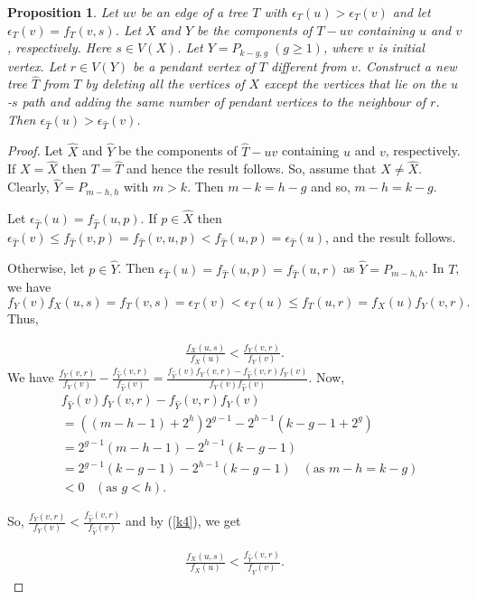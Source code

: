 \documentclass[10pt,a4paper]{amsart}
\newtheorem{proposition}[theorem]{Proposition}
\begin{document}
\begin{proposition} \label{prop5}
Let $uv$ be an edge of a tree $T$ with $\epsilon_{T}(u)>\epsilon_{T}(v)$ and let $\epsilon_{T}(v)=f_T(v,s)$. Let $X$ and $Y$ be the components of $T-uv$ containing $u$ and $v$, respectively. Here $s\in V(X)$.  Let $Y=P_{k-g,g}\;(g\geq 1)$, where $v$ is initial vertex. Let $r\in V(Y)$ be a pendant vertex of $T$ different from $v$. Construct a new tree $\hat{T}$ from $T$ by deleting all the vertices of $X$ except the vertices that lie on the $u$-$s$ path and adding the same number of pendant vertices to the neighbour of $r$. Then $\epsilon_{\hat{T}}(u)>\epsilon_{\hat{T}}(v)$.   
\end{proposition}
\begin{proof}
Let  $\hat{X}$ and $\hat{Y}$ be the components of $\hat{T}-uv$ containing $u$ and $v$, respectively. If $X=\hat{X}$ then $T=\hat{T}$ and hence the result follows. So, assume that $X\neq \hat{X}.$ Clearly, $\hat{Y}=P_{m-h,h}$ with $m>k$. Then $m-k=h-g$ and  so, $m-h=k-g$.

Let $\epsilon_{\hat{T}}(u)=f_{\hat{T}}(u,p)$. If $p\in \hat{X}$ then $\epsilon_{\hat{T}}(v)\leq f_{\hat{T}}(v,p)=f_{\hat{T}}(v,u,p)<f_{\hat{T}}(u,p)=\epsilon_{\hat{T}}(u)$, and the result follows. 

Otherwise, let $p\in \hat{Y}$. Then $\epsilon_{\hat{T}}(u)=f_{\hat{T}}(u,p)=f_{\hat{T}}(u,r)$ as $\hat{Y}=P_{m-h,h}$. In $T$, we have $$f_Y(v)f_X(u,s)=f_T(v,s)=\epsilon_{T}(v)<\epsilon_{T}(u)\leq f_{T}(u,r)=f_X(u)f_Y(v,r).$$ Thus,

\begin{align}\label{k4}
\frac{f_{X}(u,s)}{f_{X}(u)}<\frac{f_{Y}(v,r)}{f_{Y}(v)}.
\end{align}
We have $\frac{f_Y(v,r)}{f_Y(v)} - \frac{f_{\hat{Y}}(v,r)}{f_{\hat{Y}}(v)}=\frac{f_{\hat{Y}}(v)f_Y(v,r)-f_{\hat{Y}}(v,r)f_Y(v)}{f_Y(v)f_{\hat{Y}}(v)}.$ Now, 
\begin{align*} 
&f_{\hat{Y}}(v)f_Y(v,r)-f_{\hat{Y}}(v,r)f_Y(v)\\
&=((m-h-1)+2^h)2^{g-1}- 2^{h-1}(k-g-1+2^g)\\
&=2^{g-1}(m-h-1)-2^{h-1}(k-g-1)\\
&=2^{g-1}(k-g-1)-2^{h-1}(k-g-1)\;\;\;(\mbox{as $m-h=k-g$})\\
&< 0 \;\;\;(\mbox{as $g<h$}).
\end{align*} 

So, $\frac{f_Y(v,r)}{f_Y(v)} < \frac{f_{\hat{Y}}(v,r)}{f_{\hat{Y}}(v)}$ and by (\ref{k4}), we get 

\begin{align}\label{k5}
\frac{f_{X}(u,s)}{f_{X}(u)}<\frac{f_{\hat{Y}}(v,r)}{f_{\hat{Y}}(v)}.
\end{align}


\end{proof}
\end{document}
